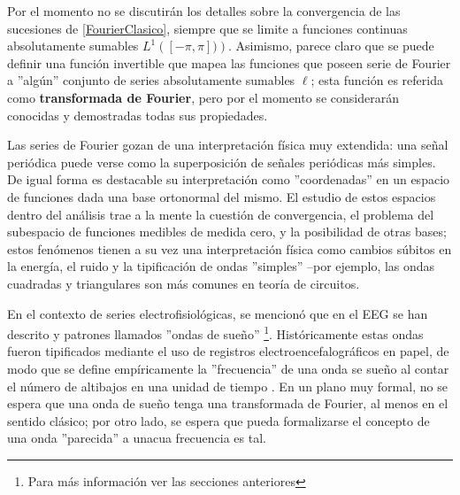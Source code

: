 
Por el momento no se discutir\'an los detalles sobre la convergencia de las sucesiones de 
\ref{FourierClasico}, siempre que se limite a funciones continuas absolutamente sumables 
$L^{1}\left([-\pi,\pi])\right)$.
Asimismo, parece claro que se puede definir una funci\'on invertible que mapea las funciones que
poseen serie de Fourier a ''alg\'un'' conjunto de series absolutamente sumables $\ell$; esta
funci\'on es referida como \textbf{transformada de Fourier}, pero por el momento se considerar\'an
conocidas y demostradas todas sus propiedades.



Las series de Fourier gozan de una interpretación física muy extendida: una se\~nal peri\'odica
puede verse como la superposici\'on de se\~nales peri\'odicas m\'as simples. 
De igual forma es destacable su interpretaci\'on como ''coordenadas'' en un espacio de funciones
dada una base ortonormal del mismo. 
El estudio de estos espacios dentro del an\'alisis trae a la mente
la cuesti\'on de convergencia,
el problema del subespacio de
funciones medibles de medida cero, y la posibilidad de otras bases; estos fen\'omenos tienen a su 
vez una interpretaci\'on f\'isica como cambios s\'ubitos en la energ\'ia, el ruido y la 
tipificaci\'on de ondas ''simples'' --por ejemplo, las ondas cuadradas y triangulares son 
m\'as comunes en teor\'ia de circuitos.

En el contexto de series electrofisiol\'ogicas, se mencion\'o que en el EEG se han descrito y
patrones llamados ''ondas de sue\~no'' \footnote{Para m\'as informaci\'on ver
las secciones anteriores}. Hist\'oricamente estas ondas fueron tipificados mediante el 
uso de registros electroencefalogr\'aficos en papel, de modo que se define emp\'iricamente
la ''frecuencia'' de una onda se sue\~no al contar el n\'umero de altibajos en una unidad
de tiempo \cite{Klonowski09}. En un plano muy formal, no se espera que una onda  de sue\~no
tenga una transformada de Fourier, al menos en el sentido cl\'asico; por otro lado, se espera que
pueda formalizarse el concepto de una onda ''parecida'' a unacua frecuencia es tal.

